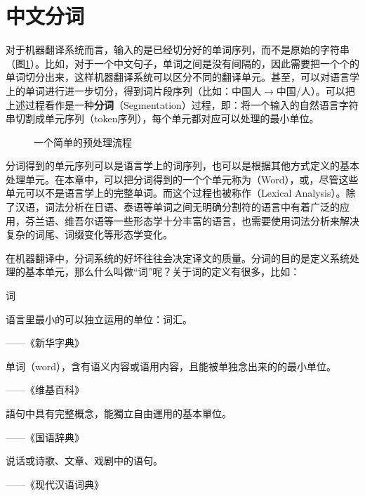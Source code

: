 \sectionnewpage
\section{中文分词}

\parinterval 对于机器翻译系统而言，输入的是已经切分好的单词序列，而不是原始的字符串（图\ref{fig:2-7}）。比如，对于一个中文句子，单词之间是没有间隔的，因此需要把一个个的单词切分出来，这样机器翻译系统可以区分不同的翻译单元。甚至，可以对语言学上的单词进行进一步切分，得到词片段序列（比如：中国人$\to$中国/人）。可以把上述过程看作是一种{\small\sffamily\bfseries{分词}}（Segmentation）过程，即：将一个输入的自然语言字符串切割成单元序列（token序列），每个单元都对应可以处理的最小单位。

\begin{figure}[htp]
\centering

\caption{一个简单的预处理流程}
\label{fig:2-7}
\end{figure}

\parinterval 分词得到的单元序列可以是语言学上的词序列，也可以是根据其他方式定义的基本处理单元。在本章中，可以把分词得到的一个个单元称为{\small{}}（Word），或{\small{}}，尽管这些单元可以不是语言学上的完整单词。而这个过程也被称作{\small{}}（Lexical Analysis）。除了汉语，词法分析在日语、泰语等单词之间无明确分割符的语言中有着广泛的应用，芬兰语、维吾尔语等一些形态学十分丰富的语言，也需要使用词法分析来解决复杂的词尾、词缀变化等形态学变化。

\parinterval 在机器翻译中，分词系统的好坏往往会决定译文的质量。分词的目的是定义系统处理的基本单元，那么什么叫做``词''呢？关于词的定义有很多，比如：

\vspace{0.5em}
\begin{definition} 词

语言里最小的可以独立运用的单位：词汇。
\begin{flushright}——《新华字典》\end{flushright}

单词（word），含有语义内容或语用内容，且能被单独念出来的的最小单位。
\begin{flushright}——《维基百科》\end{flushright}

語句中具有完整概念，能獨立自由運用的基本單位。
\begin{flushright}——《国语辞典》\end{flushright}

说话或诗歌、文章、戏剧中的语句。
\begin{flushright}——《现代汉语词典》\end{flushright}
\end{definition}

